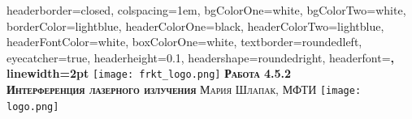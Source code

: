 \documentclass[landscape,a0paper,fontscale=0.285]{baposter} %
\begin{document}
\begin{poster}
{
headerborder=closed, %
colspacing=1em, %
bgColorOne=white, %
bgColorTwo=white, %
borderColor=lightblue, %
headerColorOne=black, %
headerColorTwo=lightblue, %
headerFontColor=white, %
boxColorOne=white, %
textborder=roundedleft, %
eyecatcher=true, %
headerheight=0.1\textheight, %
headershape=roundedright, %
headerfont=\Large\bf\textsc, %
linewidth=2pt %
}
%
{\texttt{[image: frkt\_logo.png]}} %
{\bf\textsc{Работа 4.5.2\\ Интерференция лазерного излучения}\vspace{0.5em}} %
{\textsc{Мария Шлапак, МФТИ }} %
{\texttt{[image: logo.png]}} %




\end{poster}
\end{document}

